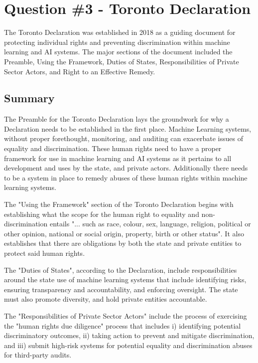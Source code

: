 \documentclass[
	letterpaper, %
]{jdf}
\begin{document}
\section{Question \#3 - Toronto Declaration}
The Toronto Declaration was established in 2018 as a guiding document for protecting individual rights and preventing discrimination within machine learning and AI systems. The major sections of the document included the Preamble, Using the Framework, Duties of States, Responsibilities of Private Sector Actors, and Right to an Effective Remedy.
\subsection{Summary}
The Preamble for the Toronto Declaration lays the groundwork for why a Declaration needs to be established in the first place. Machine Learning systems, without proper forethought, monitoring, and auditing can exacerbate issues of equality and discrimination. These human rights need to have a proper framework for use in machine learning and AI systems as it pertains to all development and uses by the state, and private actors. Additionally there needs to be a system in place to remedy abuses of these human rights within machine learning systems.

The "Using the Framework" section of the Toronto Declaration begins with establishing what the scope for the human right to equality and non-discrimination entails "... such as race, colour, sex, language, religion, political or other opinion, national or social origin, property, birth or other status". It also establishes that there are obligations by both the state and private entities to protect said human rights.

The "Duties of States", according to the Declaration, include responsibilities around the state use of machine learning systems that include identifying risks, ensuring transparency and accountability, and enforcing oversight. The state must also promote diversity, and hold private entities accountable.

The "Responsibilities of Private Sector Actors" include the process of exercising the "human rights due diligence" process that includes i) identifying potential discriminatory outcomes, ii) taking action to prevent and mitigate discrimination, and iii) submit high-risk systems for potential equality and discrimination abuses for third-party audits.
\end{document}
